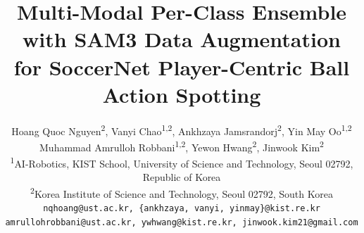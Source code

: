 \documentclass[10pt,twocolumn,letterpaper]{article}
\title{Multi-Modal Per-Class Ensemble with SAM3 Data Augmentation\\for SoccerNet Player-Centric Ball Action Spotting}
\author{%
    Hoang Quoc Nguyen\textsuperscript{2}, Vanyi Chao\textsuperscript{1,2}, Ankhzaya Jamsrandorj\textsuperscript{2}, Yin May Oo\textsuperscript{1,2}\\ Muhammad Amrulloh Robbani\textsuperscript{1,2}, Yewon Hwang\textsuperscript{2}, Jinwook Kim\textsuperscript{2}\\[1ex]
    \small\textsuperscript{1}AI-Robotics, KIST School, University of Science and Technology, Seoul 02792, Republic of Korea \\
    \small\textsuperscript{2}Korea Institute of Science and Technology, Seoul 02792, South Korea \\
    {\tt\small nqhoang@ust.ac.kr, \{ankhzaya, vanyi, yinmay\}@kist.re.kr} \\
    {\tt\small amrullohrobbani@ust.ac.kr, ywhwang@kist.re.kr, jinwook.kim21@gmail.com}
}
\begin{document}
\maketitle


{
    \small
    
    
}
\end{document}
